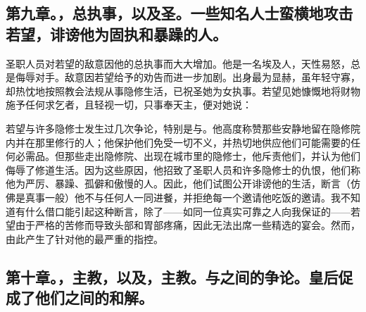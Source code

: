 
\subsection{第九章。，总执事，以及圣。一些知名人士蛮横地攻击若望，诽谤他为固执和暴躁的人。}

圣职人员对若望的敌意因他的总执事而大大增加。他是一名埃及人，天性易怒，总是侮辱对手。敌意因若望给予的劝告而进一步加剧。出身最为显赫，虽年轻守寡，却热忱地按照教会法规从事隐修生活，已祝圣她为女执事。若望见她慷慨地将财物施予任何求乞者，且轻视一切，只事奉天主，便对她说：\par

若望与许多隐修士发生过几次争论，特别是与。他高度称赞那些安静地留在隐修院内并在那里修行的人；他保护他们免受一切不义，并热切地供应他们可能需要的任何必需品。但那些走出隐修院、出现在城市里的隐修士，他斥责他们，并认为他们侮辱了修道生活。因为这些原因，他招致了圣职人员和许多隐修士的仇恨，他们称他为严厉、暴躁、孤僻和傲慢的人。因此，他们试图公开诽谤他的生活，断言（仿佛是真事一般）他不与任何人一同进餐，并拒绝每一个邀请他吃饭的邀请。我不知道有什么借口能引起这种断言，除了——如同一位真实可靠之人向我保证的——若望由于严格的苦修而导致头部和胃部疼痛，因此无法出席一些精选的宴会。然而，由此产生了针对他的最严重的指控。\par


\subsection{第十章。，主教，以及，主教。与之间的争论。皇后促成了他们之间的和解。}

